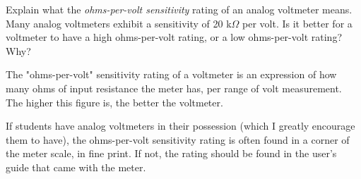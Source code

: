 

Explain what the {\it ohms-per-volt sensitivity} rating of an analog voltmeter means.  Many analog voltmeters exhibit a sensitivity of 20 k$\Omega$ per volt.  Is it better for a voltmeter to have a high ohms-per-volt rating, or a low ohms-per-volt rating?  Why?







The "ohms-per-volt" sensitivity rating of a voltmeter is an expression of how many ohms of input resistance the meter has, per range of volt measurement.  The higher this figure is, the better the voltmeter.







If students have analog voltmeters in their possession (which I greatly encourage them to have), the ohms-per-volt sensitivity rating is often found in a corner of the meter scale, in fine print.  If not, the rating should be found in the user's guide that came with the meter.



